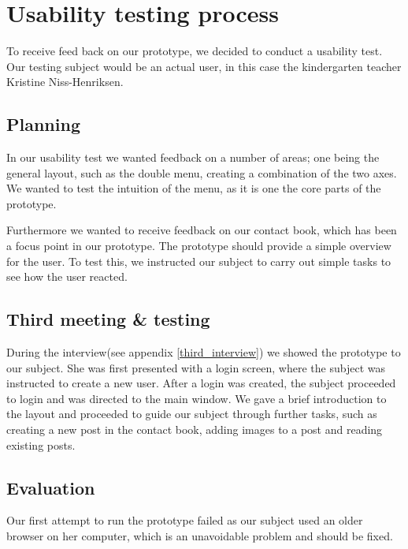 \section{Usability testing process}
To receive feed back on our prototype, we decided to conduct a usability test. Our testing subject would be an actual user, in this case the kindergarten teacher Kristine Niss-Henriksen.
\subsection{Planning}

In our usability test we wanted feedback on a number of areas; one being the general layout, such as the double menu, creating a combination of the two axes. We wanted to test the intuition of the menu, as it is one the core parts of the prototype. 
 
Furthermore we wanted to receive feedback on our contact book, which has been a focus point in our prototype. The prototype should provide a simple overview for the user. To test this, we instructed our subject to carry out simple tasks to see how the user reacted.


\subsection{Third meeting \& testing}

During the interview(see appendix \vref{third_interview}) we showed the prototype to our subject. She was first presented with a login screen, where the subject was instructed to create a new user. After a login was created, the subject proceeded to login and was directed to the main window. We gave a brief introduction to the layout and proceeded to guide our subject through further tasks, such as creating a new post in the contact book, adding images to a post and reading existing posts. 


\subsection{Evaluation}
Our first attempt to run the prototype failed as our subject used an older browser on her computer, which is an unavoidable problem and should be fixed.


